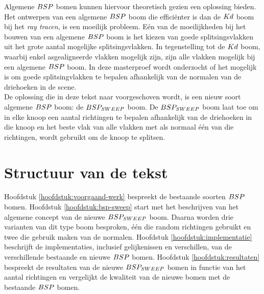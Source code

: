 Algemene $BSP$ bomen kunnen hiervoor theoretisch gezien een oplossing bieden.
Het ontwerpen van een algemene $BSP$ boom die efficiënter is dan de $Kd$ boom bij het \textit{ray tracen}, is een moeilijk probleem.
Eén van de moeilijkheden bij het bouwen van een algemene $BSP$ boom is het kiezen van goede splitsingsvlakken uit het grote aantal mogelijke splitsingsvlakken.
In tegenstelling tot de $Kd$ boom, waarbij enkel asgealigneerde vlakken mogelijk zijn, zijn alle vlakken mogelijk bij een algemene $BSP$ boom.
In deze masterproef wordt onderzocht of het mogelijk is om goede splitsingvlakken te bepalen afhankelijk van de normalen van de driehoeken in de scene.\\

De oplossing die in deze tekst naar voorgeschoven wordt, is een nieuw soort algemene $BSP$ boom: de $BSP_{SWEEP}$ boom.
De $BSP_{SWEEP}$ boom laat toe om in elke knoop een aantal richtingen te bepalen afhankelijk van de driehoeken in die knoop
en het beste vlak van alle vlakken met als normaal één van die richtingen, wordt gebruikt om de knoop te splitsen.

\section{Structuur van de tekst}
Hoofdstuk \ref{hoofdstuk:voorgaand-werk} bespreekt de bestaande soorten $BSP$ bomen. Hoofdstuk \ref{hoofdstuk:bsp-sweep} start met het beschrijven van het algemene concept van de nieuwe $BSP_{SWEEP}$ boom. Daarna worden drie varianten van dit type boom besproken, één die random richtingen gebruikt en twee die gebruik maken van de normalen. Hoofdstuk \ref{hoofdstuk:implementatie} beschrijft de implementaties, inclusief gelijkenissen en verschillen, van de verschillende bestaande en nieuwe $BSP$ bomen. Hoofdstuk \ref{hoofdstuk:resultaten} bespreekt de resultaten van de nieuwe $BSP_{SWEEP}$ bomen in functie van het aantal richtingen en vergelijkt de kwaliteit van de nieuwe bomen met de bestaande $BSP$ bomen.

